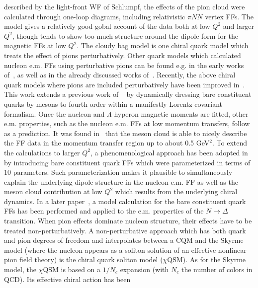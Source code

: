 described by the light-front WF of Schlumpf, 
the effects of the pion cloud were 
calculated through one-loop diagrams, including relativistic 
$\pi N N$ vertex FFs. The model gives a relatively good gobal 
account of the data both at low $Q^2$ and larger $Q^2$, 
though tends to show too much structure around the dipole form 
for the magnetic FFs at low $Q^2$. 
\newline
\indent
The cloudy bag model is one chiral quark model which 
treats the effect of pions perturbatively. Other quark models 
which calculated nucleon e.m. FFs using perturbative pions can be found 
e.g. in the early works of~\cite{Oset:1984tv,Jena:1992qx}, as well as in 
the already discussed works of~\cite{Glozman:1997fs,Glozman:1997ag}.  
Recently, the above chiral quark models where pions are included 
perturbatively have been improved in~\cite{faessler}. 
This work extends a previous work of ~\cite{Lyubovitskij:2001nm} by 
dynamically dressing bare constituent quarks by mesons to fourth order 
within a manifestly Lorentz covariant formalism. 
Once the nucleon and $\Lambda$ hyperon magnetic moments are fitted, 
other e.m. properties, such as the
nucleon e.m. FFs at low momentum transfers, follow as a prediction. 
It was found in~\cite{faessler} 
that the meson cloud is able to nicely describe 
the FF data in the momentum transfer region up to about 0.5 GeV$^2$.  
To extend the calculations to larger $Q^2$, a phenomenological approach 
has been adopted in \cite{faessler} by introducing 
bare constituent quark FFs which were parameterized 
in terms of 10 parameters. Such parameterization makes it plausible to 
simultaneously explain the underlying dipole structure in the nucleon e.m. FF
as well as the meson cloud contribution at low $Q^2$ which results from 
the underlying chiral dynamics. In a later paper~\cite{Faessler:2006ky}, a 
model calculation for the bare constituent quark FFs has been performed and 
applied to the e.m. properties of the $N \to \Delta$ transition. 
\newline
\indent
When pion effects dominate nucleon structure, their effects have to be 
treated non-perturbatively. A non-perturbative 
approach which has both quark and pion degrees of freedom 
and interpolates between a CQM and 
the Skyrme model (where the nucleon appears as a soliton solution of an 
effective nonlinear pion field theory) is 
the chiral quark soliton model ($\chi$QSM). 
As for the Skyrme model, 
the $\chi$QSM is based on a $1/N_c$ expansion  
(with $N_c$ the number of colors in QCD).  
Its effective chiral action has been
